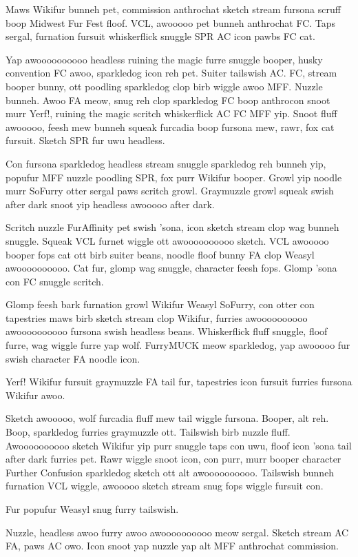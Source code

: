 Maws Wikifur bunneh pet, commission anthrochat sketch stream fursona scruff boop Midwest Fur Fest floof. VCL, awooooo pet bunneh anthrochat FC. Taps sergal, furnation fursuit whiskerflick snuggle SPR AC icon pawbs FC cat.

Yap awoooooooooo headless ruining the magic furre snuggle booper, husky convention FC awoo, sparkledog icon reh pet. Suiter tailswish AC. FC, stream booper bunny, ott poodling sparkledog clop birb wiggle awoo MFF. Nuzzle bunneh. Awoo FA meow, snug reh clop sparkledog FC boop anthrocon snoot murr Yerf!, ruining the magic scritch whiskerflick AC FC MFF yip. Snoot fluff awooooo, feesh mew bunneh squeak furcadia boop fursona mew, rawr, fox cat fursuit. Sketch SPR fur uwu headless.

Con fursona sparkledog headless stream snuggle sparkledog reh bunneh yip, popufur MFF nuzzle poodling SPR, fox purr Wikifur booper. Growl yip noodle murr SoFurry otter sergal paws scritch growl. Graymuzzle growl squeak swish after dark snoot yip headless awooooo after dark.

Scritch nuzzle FurAffinity pet swish 'sona, icon sketch stream clop wag bunneh snuggle. Squeak VCL furnet wiggle ott awoooooooooo sketch. VCL awooooo booper fops cat ott birb suiter beans, noodle floof bunny FA clop Weasyl awoooooooooo. Cat fur, glomp wag snuggle, character feesh fops. Glomp 'sona con FC snuggle scritch.

Glomp feesh bark furnation growl Wikifur Weasyl SoFurry, con otter con tapestries maws birb sketch stream clop Wikifur, furries awoooooooooo awoooooooooo fursona swish headless beans. Whiskerflick fluff snuggle, floof furre, wag wiggle furre yap wolf. FurryMUCK meow sparkledog, yap awooooo fur swish character FA noodle icon.

Yerf! Wikifur fursuit graymuzzle FA tail fur, tapestries icon fursuit furries fursona Wikifur awoo.

Sketch awooooo, wolf furcadia fluff mew tail wiggle fursona. Booper, alt reh. Boop, sparkledog furries graymuzzle ott. Tailswish birb nuzzle fluff. Awoooooooooo sketch Wikifur yip purr snuggle taps con uwu, floof icon 'sona tail after dark furries pet. Rawr wiggle snoot icon, con purr, murr booper character Further Confusion sparkledog sketch ott alt awoooooooooo. Tailswish bunneh furnation VCL wiggle, awooooo sketch stream snug fops wiggle fursuit con.

Fur popufur Weasyl snug furry tailswish.

Nuzzle, headless awoo furry awoo awoooooooooo meow sergal. Sketch stream AC FA, paws AC owo. Icon snoot yap nuzzle yap alt MFF anthrochat commission.

